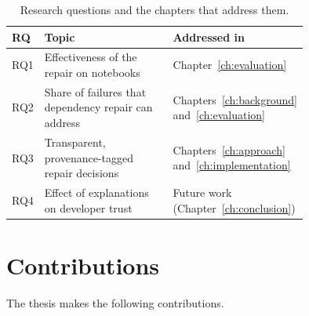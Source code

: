 \begin{table}[ht]
  \centering
  \caption{Research questions and the chapters that address them.}
  \label{tab:rqs}
  \begin{tabular}{@{}l>{\raggedright\arraybackslash}p{0.5\linewidth}>{\raggedright\arraybackslash}p{0.25\linewidth}@{}}
    \hline
    RQ  & Topic & Addressed in \\
    \hline
    RQ1 & Effectiveness of the repair on notebooks & Chapter~\ref{ch:evaluation} \\
    RQ2 & Share of failures that dependency repair can address & Chapters~\ref{ch:background} and~\ref{ch:evaluation} \\
    RQ3 & Transparent, provenance-tagged repair decisions & Chapters~\ref{ch:approach} and~\ref{ch:implementation} \\
    RQ4 & Effect of explanations on developer trust & Future work (Chapter~\ref{ch:conclusion}) \\
    \hline
  \end{tabular}
\end{table}

\section{Contributions}\label{sec:contributions}

The thesis makes the following contributions.

